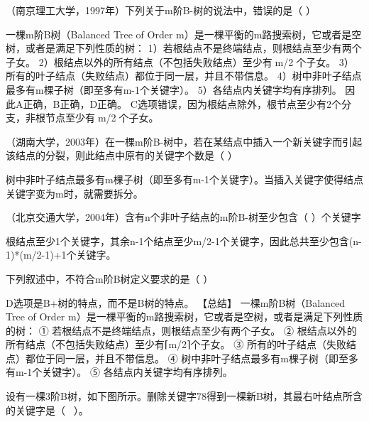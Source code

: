 \question （南京理工大学，1997年）下列关于m阶B-树的说法中，错误的是（ ）
\par{}
\begin{solution}一棵m阶B树（Balanced Tree of Order
m）是一棵平衡的m路搜索树，它或者是空树，或者是满足下列性质的树：
1）若根结点不是终端结点，则根结点至少有两个子女。
2）根结点以外的所有结点（不包括失败结点）至少有m/2个子女。
3）所有的叶子结点（失败结点）都位于同一层，并且不带信息。
4）树中非叶子结点最多有m棵子树（即至多有m-1个关键字）。
5）各结点内关键字均有序排列。 因此A正确，B正确，D正确。
C选项错误，因为根结点除外，根节点至少有2个分支，非根节点至少有m/2个子女。
\end{solution}
\question （湖南大学，2003年）在一棵m阶B-树中，若在某结点中插入一个新关键字而引起该结点的分裂，则此结点中原有的关键字个数是（
）
\par{}
\begin{solution}树中非叶子结点最多有m棵子树（即至多有m-1个关键字）。当插入关键字使得结点关键字变为m时，就需要拆分。
\end{solution}
\question （北京交通大学，2004年）含有n个非叶子结点的m阶B-树至少包含（ ）个关键字
\par{}
\begin{solution}根结点至少1个关键字，其余n-1个结点至少m/2-1个关键字，因此总共至少包含(n-1)*(m/2-1)+1个关键字。
\end{solution}
\question 下列叙述中，不符合m阶B树定义要求的是（ ）
\par{}
\begin{solution}D选项是B+树的特点，而不是B树的特点。 【总结】 一棵m阶B树（Balanced Tree
of Order
m）是一棵平衡的m路搜索树，它或者是空树，或者是满足下列性质的树： ①
若根结点不是终端结点，则根结点至少有两个子女。 ②
根结点以外的所有结点（不包括失败结点）至少有⌈m/2⌉个子女。 ③
所有的叶子结点（失败结点）都位于同一层，并且不带信息。 ④
树中非叶子结点最多有m棵子树（即至多有m-1个关键字）。 ⑤
各结点内关键字均有序排列。
\end{solution}
\question 设有一棵3阶B树，如下图所示。删除关键字78得到一棵新B树，其最右叶结点所含的关键字是（
~）。

